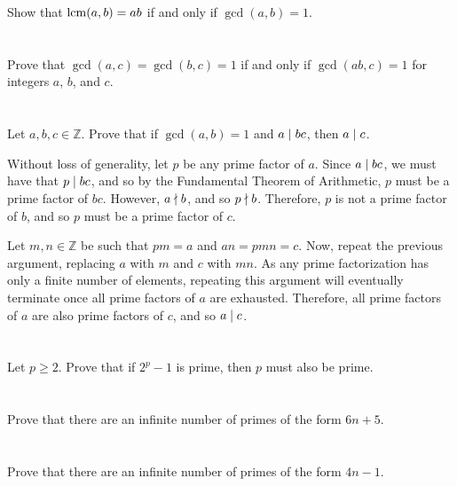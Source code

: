 Show that $\operatorname{lcm}(a,b) = ab$ if and only if $\gcd(a,b) = 1$.
\hr
\section{}\label{sec:2-26}

Prove that $\gcd(a,c) = \gcd(b,c) = 1$ if and only if $\gcd(ab,c) = 1$ for integers $a$, $b$, and $c$.
\hr
\section{}\label{sec:2-27}

Let $a, b, c \in \mathbb{Z}$. Prove that if $\gcd(a, b) = 1$ and $a \mid bc$, then $a \mid c$.
\hr

Without loss of generality, let $p$ be any prime factor of $a$. Since $a \mid bc$, we must have that $p \mid bc$, and so by the Fundamental Theorem of Arithmetic, $p$ must be a prime factor of $bc$. However, $a \nmid b$, and so $p \nmid b$. Therefore, $p$ is not a prime factor of $b$, and so $p$ must be a prime factor of $c$.

Let $m, n \in \mathbb{Z}$ be such that $pm = a$ and $an = pmn = c$. Now, repeat the previous argument, replacing $a$ with $m$ and $c$ with $mn$. As any prime factorization has only a finite number of elements, repeating this argument will eventually terminate once all prime factors of $a$ are exhausted. Therefore, all prime factors of $a$ are also prime factors of $c$, and so $a \mid c$.
\section{}\label{sec:2-28}

Let $p \geq 2$. Prove that if $2^p - 1$ is prime, then $p$ must also be prime.
\hr
\section{}\label{sec:2-29}

Prove that there are an infinite number of primes of the form $6n+5$.
\hr
\section{}\label{sec:2-30}

Prove that there are an infinite number of primes of the form $4n-1$.
\hr
\section{}\label{sec:2-31}


